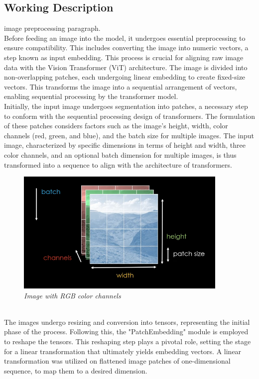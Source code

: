 \subsection{Working Description}
 image preprocessing paragraph.\\

Before feeding an image into the model, it undergoes essential preprocessing to ensure compatibility. This includes converting the image into numeric vectors, a step known as input embedding. This process is crucial for aligning raw image data with the Vision Transformer (ViT) architecture. The image is divided into non-overlapping patches, each undergoing linear embedding to create fixed-size vectors. This transforms the image into a sequential arrangement of vectors, enabling sequential processing by the transformer model.\\

Initially, the input image undergoes segmentation into patches, a necessary step to conform with the sequential processing design of transformers. The formulation of these patches considers factors such as the image's height, width, color channels (red, green, and blue), and the batch size for multiple images. The input image, characterized by specific dimensions in terms of height and width, three color channels, and an optional batch dimension for multiple images, is thus transformed into a sequence to align with the architecture of transformers.\\
\begin{figure}[htbp]
    \centering
    \includegraphics[width=4in]{img/colorbatch.png}
    \caption{\textit{Image with RGB color channels}}
\end{figure}\\
The images undergo resizing and conversion into tensors, representing the initial phase of the process. Following this, the "PatchEmbedding" module is employed to reshape the tensors. This reshaping step plays a pivotal role, setting the stage for a linear transformation that ultimately yields embedding vectors. A linear transformation was utilized on flattened image patches of one-dimensional sequence, to map them to a desired dimension.\\

